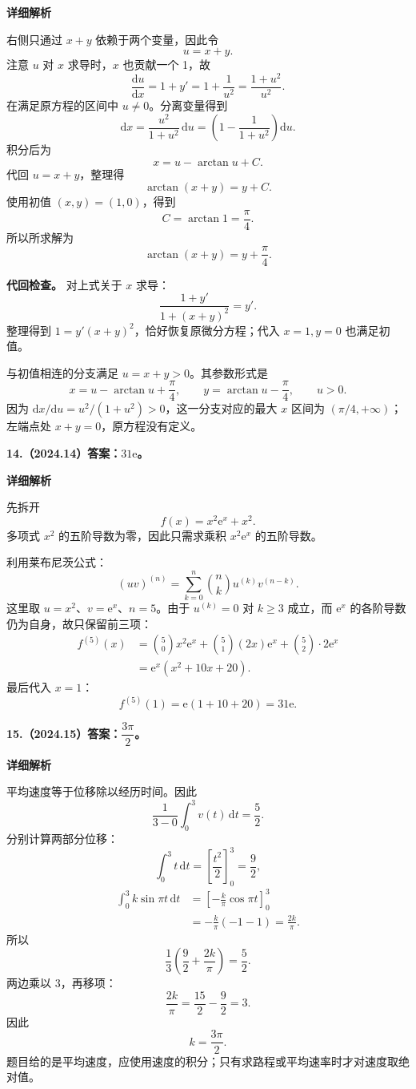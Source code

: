 \documentclass[UTF8,11pt,fontset=windows]{ctexart}
\begin{document}
\textbf{详细解析}

右侧只通过 $x+y$ 依赖于两个变量，因此令
$$
u=x+y.
$$
注意 $u$ 对 $x$ 求导时，$x$ 也贡献一个 1，故
$$
\frac{\mathrm du}{\mathrm dx}=1+y'
=1+\frac1{u^2}=\frac{1+u^2}{u^2}.
$$
在满足原方程的区间中 $u\ne0$。分离变量得到
$$
\mathrm dx=\frac{u^2}{1+u^2}\,\mathrm du
=\left(1-\frac1{1+u^2}\right)\mathrm du.
$$
积分后为
$$
x=u-\arctan u+C.
$$
代回 $u=x+y$，整理得
$$
\arctan(x+y)=y+C.
$$
使用初值 $(x,y)=(1,0)$，得到
$$
C=\arctan1=\frac\pi4.
$$
所以所求解为
$$
\boxed{\arctan(x+y)=y+\frac\pi4}.
$$

\textbf{代回检查。} 对上式关于 $x$ 求导：
$$
\frac{1+y'}{1+(x+y)^2}=y'.
$$
整理得到 $1=y'(x+y)^2$，恰好恢复原微分方程；代入 $x=1,y=0$ 也满足初值。

与初值相连的分支满足 $u=x+y>0$。其参数形式是
$$
x=u-\arctan u+\frac\pi4,
\qquad y=\arctan u-\frac\pi4,
\qquad u>0.
$$
因为 $\mathrm dx/\mathrm du=u^2/(1+u^2)>0$，这一分支对应的最大 $x$ 区间为 $(\pi/4,+\infty)$；左端点处 $x+y=0$，原方程没有定义。

\clearpage

\textbf{14.（2024.14）答案：$31\mathrm e$。}

\textbf{详细解析}

先拆开
$$
f(x)=x^2\mathrm e^x+x^2.
$$
多项式 $x^2$ 的五阶导数为零，因此只需求乘积 $x^2\mathrm e^x$ 的五阶导数。

利用莱布尼茨公式：
$$
(uv)^{(n)}=\sum_{k=0}^n\binom nk u^{(k)}v^{(n-k)}.
$$
这里取 $u=x^2$、$v=\mathrm e^x$、$n=5$。由于 $u^{(k)}=0$ 对 $k\ge3$ 成立，而 $\mathrm e^x$ 的各阶导数仍为自身，故只保留前三项：
$$
\begin{aligned}
f^{(5)}(x)
&=\binom50x^2\mathrm e^x
+\binom51(2x)\mathrm e^x
+\binom52\cdot2\mathrm e^x\\
&=\mathrm e^x(x^2+10x+20).
\end{aligned}
$$
最后代入 $x=1$：
$$
\boxed{f^{(5)}(1)=\mathrm e(1+10+20)=31\mathrm e}.
$$

\clearpage

\textbf{15.（2024.15）答案：$\dfrac{3\pi}{2}$。}

\textbf{详细解析}

平均速度等于位移除以经历时间。因此
$$
\frac1{3-0}\int_0^3v(t)\,\mathrm dt=\frac52.
$$
分别计算两部分位移：
$$
\int_0^3t\,\mathrm dt=\left[\frac{t^2}2\right]_0^3=\frac92,
$$
$$
\begin{aligned}
\int_0^3k\sin\pi t\,\mathrm dt
&=\left[-\frac k\pi\cos\pi t\right]_0^3\\
&=-\frac k\pi(-1-1)=\frac{2k}\pi.
\end{aligned}
$$
所以
$$
\frac13\left(\frac92+\frac{2k}\pi\right)=\frac52.
$$
两边乘以 3，再移项：
$$
\frac{2k}\pi=\frac{15}2-\frac92=3.
$$
因此
$$
\boxed{k=\frac{3\pi}{2}}.
$$
题目给的是平均速度，应使用速度的积分；只有求路程或平均速率时才对速度取绝对值。
\end{document}
